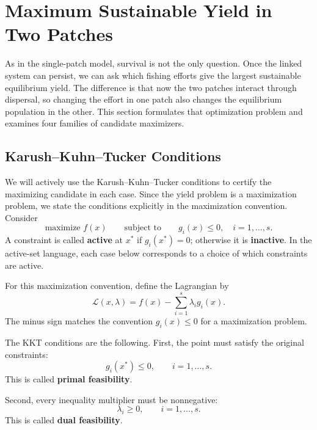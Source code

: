 \documentclass{article}
\numberwithin{equation}{section}
\begin{document}
\section{Maximum Sustainable Yield in Two Patches}

As in the single-patch model, survival is not the only question. Once the
linked system can persist, we can ask which fishing efforts give the
largest sustainable equilibrium yield. The difference is that now the two
patches interact through dispersal, so changing the effort in one patch
also changes the equilibrium population in the other. This section
formulates that optimization problem and examines four families of
candidate maximizers.

\subsection{Karush--Kuhn--Tucker Conditions}

We will actively use the Karush--Kuhn--Tucker conditions to certify the
maximizing candidate in each case. Since the yield problem is a
maximization problem, we state the conditions explicitly in the
maximization convention. Consider
\begin{equation}
    \label{eq:kkt-general-problem}
    \text{maximize } f(x)
    \qquad\text{subject to}\qquad
    g_i(x)\leq0,\quad i=1,\ldots,s.
\end{equation}
A constraint is called \textbf{active} at $x^*$ if $g_i(x^*)=0$;
otherwise it is \textbf{inactive}. In the active-set language, each case
below corresponds to a choice of which constraints are active.

For this maximization convention, define the Lagrangian by
\begin{equation}
    \label{eq:kkt-lagrangian}
    \mathcal L(x,\lambda)
    =
    f(x)-\sum_{i=1}^s \lambda_i g_i(x).
\end{equation}
The minus sign matches the convention $g_i(x)\leq0$ for a maximization
problem.

The KKT conditions are the following. First, the point must satisfy the
original constraints:
\begin{equation}
    \label{eq:kkt-primal-feasibility}
    g_i(x^*)\leq0,
    \qquad i=1,\ldots,s.
\end{equation}
This is called \textbf{primal feasibility}.

Second, every inequality multiplier must be nonnegative:
\begin{equation}
    \label{eq:kkt-dual-feasibility}
    \lambda_i\geq0,
    \qquad i=1,\ldots,s.
\end{equation}
This is called \textbf{dual feasibility}.
\end{document}
